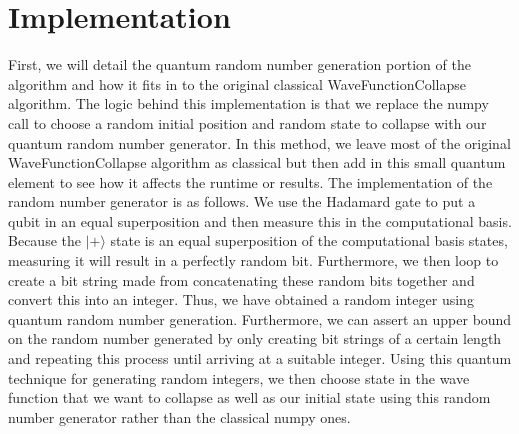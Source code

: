 \documentclass[10pt]{article}
\begin{document}
\section{Implementation}
\indent First, we will detail the quantum random number generation portion of the algorithm and how it fits in to the original classical WaveFunctionCollapse algorithm. The logic behind this implementation is that we replace the numpy call to choose a random initial position and random state to collapse with our quantum random number generator. In this method, we leave most of the original WaveFunctionCollapse algorithm as classical but then add in this small quantum element to see how it affects the runtime or results. The implementation of the random number generator is as follows. We use the Hadamard gate to put a qubit in an equal superposition and then measure this in the computational basis. Because the $|+\rangle$ state is an equal superposition of the computational basis states, measuring it will result in a perfectly random bit. Furthermore, we then loop to create a bit string made from concatenating these random bits together and convert this into an integer. Thus, we have obtained a random integer using quantum random number generation. Furthermore, we can assert an upper bound on the random number generated by only creating bit strings of a certain length and repeating this process until arriving at a suitable integer. Using this quantum technique for generating random integers, we then choose state in the wave function that we want to collapse as well as our initial state using this random number generator rather than the classical numpy ones. \\
\end{document}

